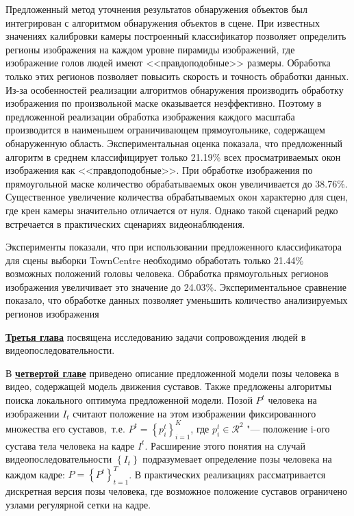 Предложенный метод уточнения результатов обнаружения объектов был интегрирован с алгоритмом обнаружения объектов в сцене. При известных значениях калибровки камеры построенный классификатор позволяет определить регионы изображения на каждом уровне пирамиды изображений, где изображение голов людей имеют <<правдоподобные>> размеры. Обработка только этих регионов позволяет повысить скорость и точность обработки данных. Из-за особенностей реализации алгоритмов обнаружения производить обработку изображения по произвольной маске оказывается неэффективно. Поэтому в предложенной реализации обработка изображения каждого масштаба производится в наименьшем ограничивающем прямоугольнике, содержащем обнаруженную область. Экспериментальная оценка показала, что предложенный алгоритм в среднем классифицирует только 21.19\% всех просматриваемых окон изображения как <<правдоподобные>>. При обработке изображения по прямоугольной маске количество обрабатываемых окон увеличивается до 38.76\%. Существенное увеличение количества обрабатываемых окон характерно для сцен, где крен камеры значительно отличается от нуля. Однако такой сценарий редко встречается в практических сценариях видеонаблюдения.

Эксперименты показали, что при использовании предложенного классификатора для сцены выборки TownCentre \cite{benfold2011stable} необходимо обработать только 21.44\% возможных положений головы человека. Обработка прямоугольных регионов изображения увеличивает это значение до 24.03\%. Экспериментальное сравнение показало, что  обработке данных позволяет уменьшить количество анализируемых регионов изображения 

\underline{\textbf{Третья глава}} посвящена исследованию задачи сопровождения людей в видеопоследовательности.

В \underline{\textbf{четвертой главе}} приведено описание предложенной модели позы человека в видео, содержащей модель движения суставов. Также предложены алгоритмы поиска локального оптимума предложенной модели. Позой $P^t$ человека на изображении $I_t$ считают положение на этом изображении фиксированного множества его суставов,~т.\:е. $P^t=\left\{p_i^t\right\}_{i=1}^K$, где $p_i^t \in \mathcal{R}^2$ "--- положение i-ого сустава тела человека на кадре $I^t$. Расширение этого понятия на случай видеопоследовательности $\left\{I_t\right\}$ подразумевает определение позы человека на каждом кадре: $P=\left\{P^t\right\}_{t=1}^{T}$. В практических реализациях рассматривается дискретная версия позы человека, где возможное положение суставов ограничено узлами регулярной сетки на кадре.

